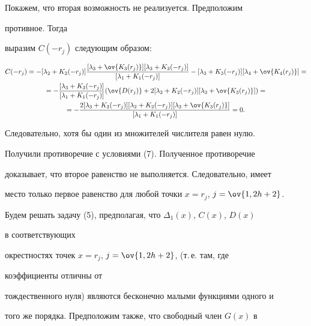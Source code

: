 \begin{pf}
 


\noindent Покажем, что вторая возможность не реализуется. Предположим 


противное. Тогда 


выразим $C(-r_j)$ следующим образом:


\begin{multline*} 


C(-r_j)=-[\lambda_2+K_2(-r_j)]


\frac{[\lambda_3+\ov{K_3(r_j)}][\lambda_3+K_3(-r_j)]} 


{[\lambda_1+K_1(-r_j)]}-[\lambda_3+K_3(-r_j)] 


[\lambda_4+\ov{K_4(r_j)}] = \\ 


% 


=-\frac{[\lambda_3+K_3(-r_j)]}{[\lambda_1+K_1(-r_j)]} 


(\ov{D(r_j)}+2[\lambda_2+K_2(-r_j)] 


[\lambda_3+\ov{K_3(r_j)}])= \\


%


=-\frac{2[\lambda_3+K_3(-r_j)][\lambda_2+K_2(-r_j)] 


[\lambda_3+\ov{K_3(r_j)}]} 


{[\lambda_1+K_1(-r_j)]}=0. 


\end{multline*} 


Следовательно, хотя бы один из множителей числителя равен нулю. 


Получили противоречие с условиями (7). Полученное противоречие 


доказывает, что второе равенство не выполняется. Следовательно, имеет 


место только первое равенство для любой точки $x=r_j$, $j=\ov{1,2h+2}$.  


\end{pf}


 


Будем решать задачу (5), предполагая, что $\Delta_1(x)$, $C(x)$, $D(x)$ 


в соответствующих 


окрестностях точек $x=r_j$, $j=\ov{1,2h+2}$, (т.\,е. там, где 


коэффициенты отличны от 


тождественного нуля) являются бесконечно малыми функциями одного и 


того же порядка. Предположим также, что свободный член $G(x)$ в 


